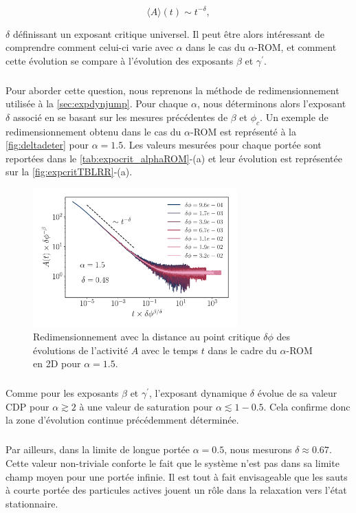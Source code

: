 \begin{equation}
	 \langle A \rangle (t) \sim t^{-\delta},
\end{equation}

\noindent $\delta$ définissant un exposant critique universel. Il peut être alors intéressant de comprendre comment celui-ci varie avec $\alpha$ dans le cas du $\alpha$-ROM, et comment cette évolution se compare à l'évolution des exposants $\beta$ et $\gamma^\prime$.

\subparagraph{}Pour aborder cette question, nous reprenons la méthode de redimensionnement utilisée à la \autoref{sec:expdynjump}. Pour chaque $\alpha$, nous déterminons alors l'exposant $\delta$ associé en se basant sur les mesures précédentes de $\beta$ et $\phi_c$. Un exemple de redimensionnement obtenu dans le cas du $\alpha$-ROM est représenté à la \autoref{fig:deltadeter} pour $\alpha = 1.5$. Les valeurs mesurées pour chaque portée sont reportées dans le \autoref{tab:expocrit_alphaROM}-(a) et leur évolution est représentée sur la \autoref{fig:expcritTBLRR}-(a).

\begin{figure}[h]
	\centering
	\includegraphics[width=0.7\textwidth]{Chapitre3/Figures/Delta/DeltaDetermination.pdf}
	\caption{Redimensionnement avec la distance au point critique $\delta\phi$ des évolutions de l'activité $A$ avec le temps $t$ dans le cadre du $\alpha$-ROM en 2D pour $\alpha = 1.5$.}
	\label{fig:deltadeter}
\end{figure}

\subparagraph{}Comme pour les exposants $\beta$ et $\gamma^\prime$, l'exposant dynamique $\delta$ évolue de sa valeur CDP pour $\alpha\gtrsim 2$ à une valeur de saturation pour $\alpha \lesssim 1-0.5$. Cela confirme donc la zone d'évolution continue précédemment déterminée.

\subparagraph{}Par ailleurs, dans la limite de longue portée $\alpha=0.5$, nous mesurons $\delta\approx0.67$. Cette valeur non-triviale conforte le fait que le système n'est pas dans sa limite champ moyen pour une portée infinie. Il est tout à fait envisageable que les sauts à courte portée des particules actives jouent un rôle dans la relaxation vers l'état stationnaire.

